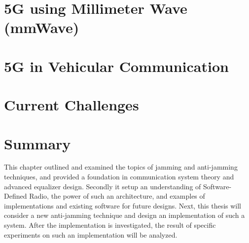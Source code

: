 \section{5G using Millimeter Wave (mmWave)}

\section{5G in Vehicular Communication}

\section{Current Challenges}

\section{Summary}
This chapter outlined and examined the topics of jamming and anti-jamming techniques, and provided a foundation in communication system theory and advanced equalizer design.  Secondly it setup an understanding of Software-Defined Radio, the power of such an architecture, and examples of implementations and existing software for future designs.  Next, this thesis will consider a new anti-jamming technique and design an implementation of such a system.  After the implementation is investigated, the result of specific experiments on such an implementation will be analyzed.\\
